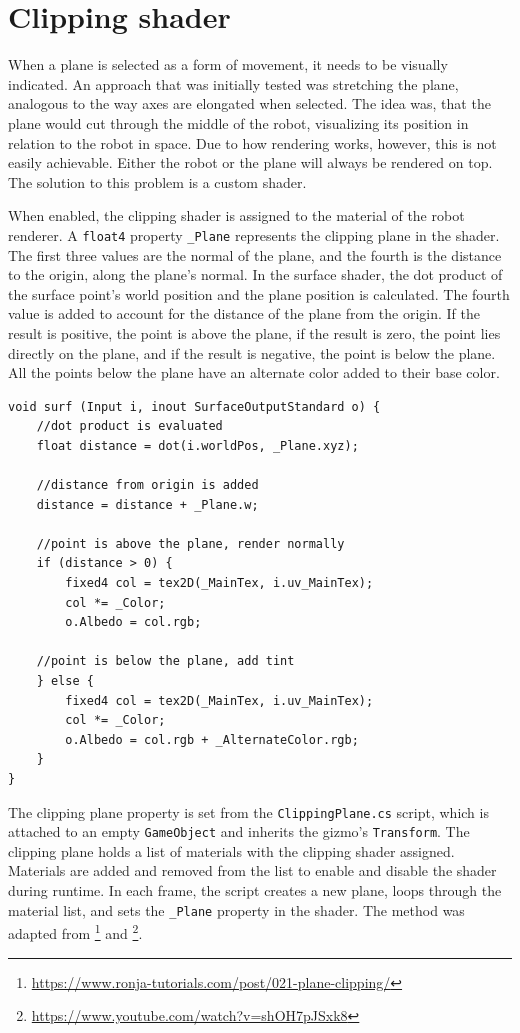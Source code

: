 \section{Clipping shader}

When a plane is selected as a form of movement, it needs to be visually indicated. An approach that was initially tested was stretching the plane, analogous to the way axes are elongated when selected. The idea was, that the plane would cut through the middle of the robot, visualizing its position in relation to the robot in space. Due to how rendering works, however, this is not easily achievable. Either the robot or the plane will always be rendered on top. The solution to this problem is a custom shader.

When enabled, the clipping shader is assigned to the material of the robot renderer. A \texttt{float4} property \texttt{\_Plane} represents the clipping plane in the shader. The first three values are the normal of the plane, and the fourth is the distance to the origin, along the plane's normal. In the surface shader, the dot product of the surface point's world position and the plane position is calculated. The fourth value is added to account for the distance of the plane from the origin. If the result is positive, the point is above the plane, if the result is zero, the point lies directly on the plane, and if the result is negative, the point is below the plane. All the points below the plane have an alternate color added to their base color.

\begin{lstlisting}[style=sharpc, breaklines=true]
void surf (Input i, inout SurfaceOutputStandard o) {
    //dot product is evaluated
    float distance = dot(i.worldPos, _Plane.xyz);

    //distance from origin is added
    distance = distance + _Plane.w;

    //point is above the plane, render normally
    if (distance > 0) {
        fixed4 col = tex2D(_MainTex, i.uv_MainTex);
        col *= _Color;
        o.Albedo = col.rgb;
    
    //point is below the plane, add tint
    } else {
        fixed4 col = tex2D(_MainTex, i.uv_MainTex);
        col *= _Color;
        o.Albedo = col.rgb + _AlternateColor.rgb;
    }
}
\end{lstlisting}

The clipping plane property is set from the \texttt{ClippingPlane.cs} script, which is attached to an empty \texttt{GameObject} and inherits the gizmo's \texttt{Transform}. The clipping plane holds a list of materials with the clipping shader assigned. Materials are added and removed from the list to enable and disable the shader during runtime. In each frame, the script creates a new plane, loops through the material list, and sets the \texttt{\_Plane} property in the shader. The method was adapted from \footnote{\href{https://www.ronja-tutorials.com/post/021-plane-clipping/}{https://www.ronja-tutorials.com/post/021-plane-clipping/}} and \footnote{\href{https://www.youtube.com/watch?v=shOH7pJSxk8}{https://www.youtube.com/watch?v=shOH7pJSxk8}}.

